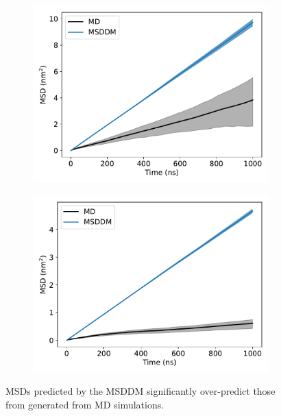 \documentclass{article}
\begin{document}
\begin{figure}
\begin{subfigure}{0.45\textwidth}
  \caption{}\label{fig:GCL_msddm}
  \end{subfigure}
  \begin{subfigure}{0.45\textwidth}
  \includegraphics[width=\textwidth]{MET_msddm.pdf}
  \caption{}\label{fig:MET_msddm}
  \end{subfigure}
  \begin{subfigure}{0.45\textwidth}
  \includegraphics[width=\textwidth]{ACH_msddm.pdf}
  \caption{}\label{fig:ACH_msddm}
  \end{subfigure}
  \caption{MSDs predicted by the MSDDM significantly over-predict those
  from generated from MD simulations.}\label{fig:msddm_performance}
  \end{figure}
  
\end{document}

